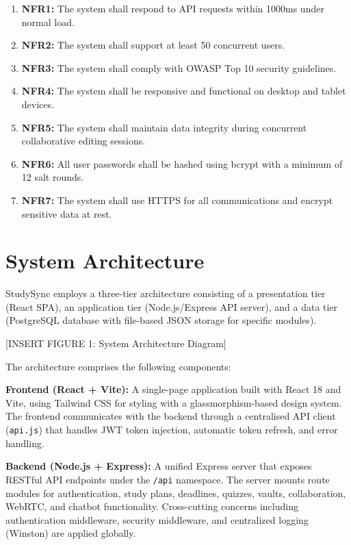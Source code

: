 \documentclass[12pt,a4paper]{report}
\begin{document}
\begin{enumerate}
    \item \textbf{NFR1:} The system shall respond to API requests within 1000ms under normal load.
    \item \textbf{NFR2:} The system shall support at least 50 concurrent users.
    \item \textbf{NFR3:} The system shall comply with OWASP Top 10 security guidelines.
    \item \textbf{NFR4:} The system shall be responsive and functional on desktop and tablet devices.
    \item \textbf{NFR5:} The system shall maintain data integrity during concurrent collaborative editing sessions.
    \item \textbf{NFR6:} All user passwords shall be hashed using bcrypt with a minimum of 12 salt rounds.
    \item \textbf{NFR7:} The system shall use HTTPS for all communications and encrypt sensitive data at rest.
\end{enumerate}

\section{System Architecture}

StudySync employs a three-tier architecture consisting of a presentation tier (React SPA), an application tier (Node.js/Express API server), and a data tier (PostgreSQL database with file-based JSON storage for specific modules).

[INSERT FIGURE 1: System Architecture Diagram]

The architecture comprises the following components:

\textbf{Frontend (React + Vite):} A single-page application built with React 18 and Vite, using Tailwind CSS for styling with a glassmorphism-based design system. The frontend communicates with the backend through a centralised API client (\texttt{api.js}) that handles JWT token injection, automatic token refresh, and error handling.

\textbf{Backend (Node.js + Express):} A unified Express server that exposes RESTful API endpoints under the \texttt{/api} namespace. The server mounts route modules for authentication, study plans, deadlines, quizzes, vaults, collaboration, WebRTC, and chatbot functionality. Cross-cutting concerns including authentication middleware, security middleware, and centralized logging (Winston) are applied globally.
\end{document}
